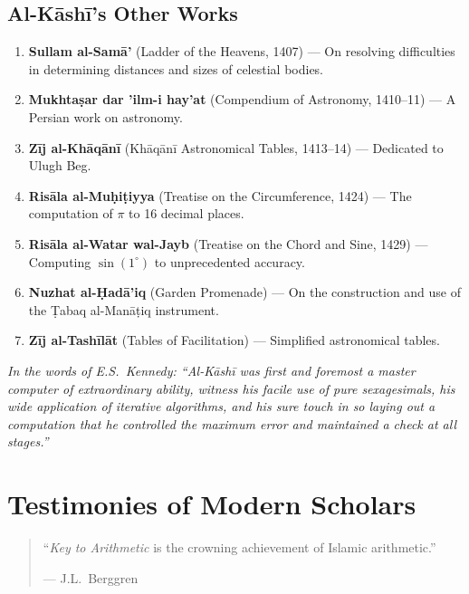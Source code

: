 \documentclass[11pt,a4paper]{article}
\newcommand{\cnote}[1]{\textcolor{notecolor}{\textit{#1}}}
\begin{document}
\subsection{Al-K\=ash\=i's Other Works}

\begin{enumerate}[label=\arabic*.]
  \item \textbf{Sullam al-Sam\=a'} (Ladder of the Heavens, 1407) --- On
  resolving difficulties in determining distances and sizes of celestial
  bodies.
  \item \textbf{Mukhta\d{s}ar dar 'ilm-i hay'at} (Compendium of Astronomy,
  1410--11) --- A Persian work on astronomy.
  \item \textbf{Z\=ij al-Kh\=aq\=an\=i} (Kh\=aq\=an\=i Astronomical Tables,
  1413--14) --- Dedicated to Ulugh Beg.
  \item \textbf{Ris\=ala al-Mu\d{h}i\d{t}iyya} (Treatise on the Circumference,
  1424) --- The computation of $\pi$ to 16 decimal places.
  \item \textbf{Ris\=ala al-Watar wal-Jayb} (Treatise on the Chord and
  Sine, 1429) --- Computing $\sin(1^\circ)$ to unprecedented accuracy.
  \item \textbf{Nuzhat al-\d{H}ad\=a'iq} (Garden Promenade) --- On the
  construction and use of the \d{T}abaq al-Man\=a\d{t}iq instrument.
  \item \textbf{Z\=ij al-Tash\=il\=at} (Tables of Facilitation) ---
  Simplified astronomical tables.
\end{enumerate}

\vspace{0.5cm}
\cnote{In the words of E.S.\ Kennedy: ``Al-K\=ash\=i was first and foremost
a master computer of extraordinary ability, witness his facile use of
pure sexagesimals, his wide application of iterative algorithms, and his
sure touch in so laying out a computation that he controlled the maximum
error and maintained a check at all stages.''}
\clearpage

\section{Testimonies of Modern Scholars}
\label{app:scholars}

\begin{quote}
``\textit{Key to Arithmetic} is the crowning achievement of Islamic
arithmetic.''
\begin{flushright}
--- J.L.\ Berggren
\end{flushright}
\end{quote}
\end{document}
